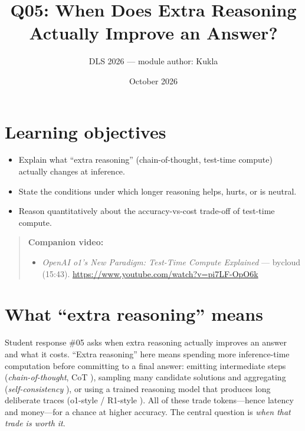 \documentclass[11pt]{article}
\title{Q05: When Does Extra Reasoning Actually Improve an Answer?}
\author{DLS 2026 --- module author: Kukla}
\date{October 2026}
\begin{document}
\maketitle

\section*{Learning objectives}
\begin{itemize}[leftmargin=1.4em]
\item Explain what ``extra reasoning'' (chain-of-thought, test-time compute) actually changes at inference.
\item State the conditions under which longer reasoning helps, hurts, or is neutral.
\item Reason quantitatively about the accuracy-vs-cost trade-off of test-time compute.
\end{itemize}

\begin{quote}\small\textbf{Companion video:}\begin{itemize}\setlength\itemsep{0pt}\item \emph{OpenAI o1's New Paradigm: Test-Time Compute Explained} --- bycloud (15:43). \url{https://www.youtube.com/watch?v=pi7LF-OpO6k}\end{itemize}\end{quote}

\section{What ``extra reasoning'' means}
Student response \#05 asks when extra reasoning actually improves an answer and what it costs.
``Extra reasoning'' here means spending more inference-time computation before committing to a final
answer: emitting intermediate steps (\emph{chain-of-thought}, CoT \citep{wei2022cot}), sampling many
candidate solutions and aggregating (\emph{self-consistency} \citep{wang2023selfconsistency}), or using
a trained reasoning model that produces long deliberate traces (o1-style / R1-style
\citep{deepseekr1}). All of these trade tokens---hence latency and money---for a chance at higher
accuracy. The central question is \emph{when that trade is worth it}.
\end{document}
